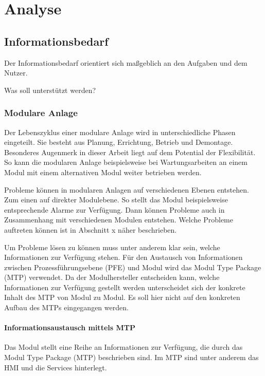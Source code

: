 
\chapter{Analyse}
\label{sec:Anforderungsanalyse}

\section{Informationsbedarf}
Der Informationsbedarf orientiert sich maßgeblich an den Aufgaben und dem Nutzer.

Was soll unterstützt werden?

\subsection{Modulare Anlage}
Der Lebenszyklus einer modulare Anlage wird in unterschiedliche Phasen eingeteilt. Sie besteht aus Planung, Errichtung, Betrieb und Demontage. \cite{} Besonderes Augenmerk in dieser Arbeit liegt auf dem Potential der Flexibilität. So kann die modularen Anlage beispielsweise bei Wartungsarbeiten an einem Modul mit einem alternativen Modul weiter betrieben werden.

Probleme können in modularen Anlagen auf verschiedenen Ebenen entstehen. Zum einen auf direkter Modulebene. So stellt das Modul beispielsweise entsprechende Alarme zur Verfügung. Dann können Probleme auch in Zusammenhang mit verschiedenen Modulen entstehen. Welche Probleme auftreten können ist in Abschnitt x näher beschrieben.

Um Probleme lösen zu können muss unter anderem klar sein, welche Informationen zur Verfügung stehen. Für den Austausch von Informationen zwischen Prozessführungsebene (PFE) und Modul wird das Modul Type Package (MTP) verwendet. Da der Modulhersteller entscheiden kann, welche Informationen zur Verfügung gestellt werden unterscheidet sich der konkrete Inhalt des MTP von Modul zu Modul. Es soll hier nicht auf den konkreten Aufbau des MTPs eingegangen werden.

\subsubsection{Informationsaustausch mittels MTP}
Das Modul stellt eine Reihe an Informationen zur Verfügung, die durch das Modul Type Package (MTP) beschrieben sind. Im MTP sind unter anderem das HMI und die Services hinterlegt.


